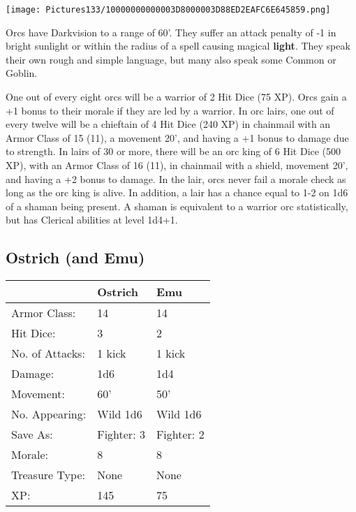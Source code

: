 \documentclass[a4paper,twoside,openany,10pt]{book}
\begin{document}
\begin{multicols}{2}
\begin{center} \texttt{[image: Pictures133/10000000000003D8000003D88ED2EAFC6E645859.png]} \end{center}


Orcs have Darkvision to a range of 60'. They suffer an attack penalty of -1 in bright sunlight or within the radius of a spell causing magical \textbf{light}. They speak their own rough and simple language, but many also speak some Common or Goblin.

One out of every eight orcs will be a warrior of 2 Hit Dice (75 XP). Orcs gain a +1 bonus to their morale if they are led by a warrior. In orc lairs, one out of every twelve will be a chieftain of 4 Hit Dice (240 XP) in chainmail with an Armor Class of 15 (11), a movement 20', and having a +1 bonus to damage due to strength. In lairs of 30 or more, there will be an orc king of 6 Hit Dice (500 XP), with an Armor Class of 16 (11), in chainmail with a shield, movement 20', and having a +2 bonus to damage. In the lair, orcs never fail a morale check as long as the orc king is alive. In addition, a lair has a chance equal to 1-2 on 1d6 of a shaman being present. A shaman is equivalent to a warrior orc statistically, but has Clerical abilities at level 1d4+1.


\subsection*{Ostrich (and Emu)}\label{ostrich-and-emu}

\begin{tabularx}{0.50\textwidth}{@{}llX@{}}
& Ostrich & Emu \\\hline
Armor Class: & 14 & 14 \\\hline
Hit Dice: & 3 & 2 \\\hline
No. of Attacks: & 1 kick & 1 kick \\\hline
Damage: & 1d6 & 1d4 \\\hline
Movement: & 60' & 50' \\\hline
No. Appearing: & Wild 1d6 & Wild 1d6 \\\hline
Save As: & Fighter: 3 & Fighter: 2 \\\hline
Morale: & 8 & 8 \\\hline
Treasure Type: & None & None \\\hline
XP: & 145 & 75 \\\hline
\end{tabularx}\medskip


\end{multicols}
\end{document}
